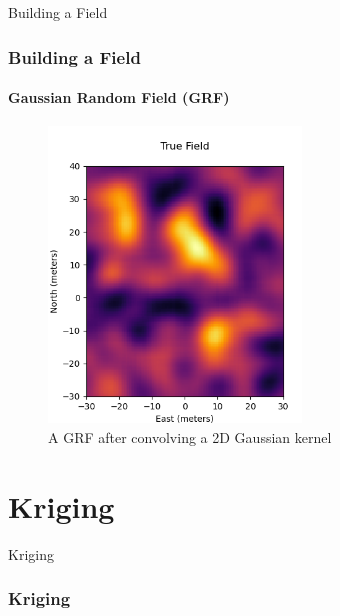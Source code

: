\documentclass[professionalfont,10pt]{beamer}
\begin{document}
	\begin{frame}[t]{Building a Field}
		\frametitle{Building a Field}
		\framesubtitle{Gaussian Random Field (GRF)}
		\hskip-0.75cm
		\begin{minipage}[t]{0.2\linewidth}\vspace{-0.5cm}
			\tiny\tableofcontents[currentsection,currentsubsection,hideothersubsections,subsectionstyle=show/shaded]
		\end{minipage}
		\hfill%
		\begin{minipage}[t]{0.86\linewidth}\vspace{-0.5cm}
			\begin{figure}[t]
				\centering
				\captionsetup{width=0.9\textwidth}
				\includegraphics[width=0.6\textwidth]{../images/GRFafterConv.png}
				\caption{A GRF after convolving a 2D Gaussian kernel}
				\label{CFandEncoder}
			\end{figure}
		\end{minipage}
		\vfill%
	\end{frame}

	\section{Kriging}
	\begin{frame}[t]{Kriging}
		\frametitle{Kriging}
		\hskip-0.75cm
		\begin{minipage}[t]{0.2\linewidth}\vspace{-0.5cm}
			\tiny\tableofcontents[currentsection,currentsubsection,hideothersubsections,subsectionstyle=show/shaded]
		\end{minipage}
		\hfill%
		\begin{minipage}[t]{0.86\linewidth}\vspace{-0.5cm}
			\begin{itemize}
				
			\end{itemize}
		\end{minipage}
		\vfill%
	\end{frame}
\end{document}

